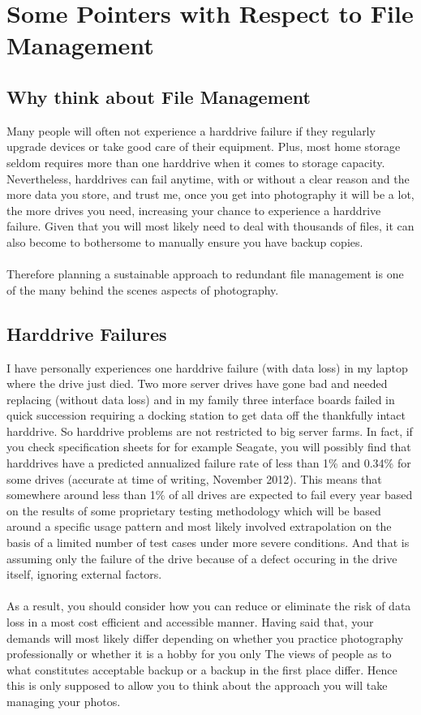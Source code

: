 \chapter{Some Pointers with Respect to File Management}

\section{Why think about File Management}

Many people will often not experience a harddrive failure if they regularly upgrade devices or take good care of their equipment. Plus, most home storage seldom requires more than one harddrive when it comes to storage capacity. Nevertheless, harddrives can fail anytime, with or without a clear reason and the more data you store, and trust me, once you get into photography it will be a lot, the more drives you need, increasing your chance to experience a harddrive failure. Given that you will most likely need to deal with thousands of files, it can also become to bothersome to manually ensure you have backup copies.
\\
\\
Therefore planning a sustainable approach to redundant file management is one of the many behind the scenes aspects of photography.

\section{Harddrive Failures}

I have personally experiences one harddrive failure (with data loss) in my laptop where the drive just died. Two more server drives have gone bad and needed replacing (without data loss) and in my family three interface boards failed in quick succession requiring a docking station to get data off the thankfully intact harddrive.
So harddrive problems are not restricted to big server farms. In fact, if you check specification sheets for for example Seagate, you will possibly find that harddrives have a predicted annualized failure rate of less than 1\% and 0.34\% for some drives (accurate at time of writing, November 2012).
This means that somewhere around less than 1\% of all drives are expected to fail every year based on the results of some proprietary testing methodology which will be based around a specific usage pattern and most likely involved extrapolation on the basis of a limited number of test cases under more severe conditions. And that is assuming only the failure of the drive because of a defect occuring in the drive itself, ignoring external factors.
\\
\\
As a result, you should consider how you can reduce or eliminate the risk of data loss in a most cost efficient and accessible manner. Having said that, your demands will most likely differ depending on whether you practice photography professionally or whether it is a hobby for you only
The views of people as to what constitutes acceptable backup or a backup in the first place differ. Hence this is only supposed to allow you to think about the approach you will take managing your photos.

